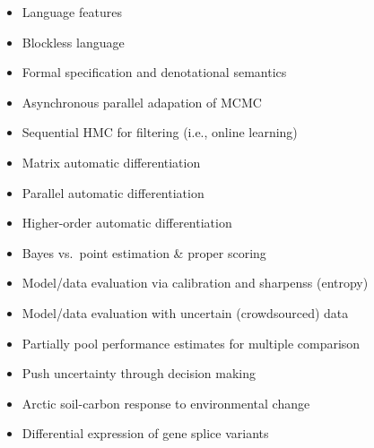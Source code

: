 \documentclass[10pt]{report}
\begin{document}
\begin{itemize}
\item Language features
\item Blockless language
\item Formal specification and denotational semantics
\end{itemize}

\begin{itemize}
\item Asynchronous parallel adapation of MCMC
\item Sequential HMC for filtering (i.e., online learning)
\item Matrix automatic differentiation
\item Parallel automatic differentiation
\item Higher-order automatic differentiation
\end{itemize}

\begin{itemize}
\item Bayes vs.\ point estimation \& proper scoring
\item Model/data evaluation via calibration and sharpenss (entropy)
\item Model/data evaluation with uncertain (crowdsourced) data
\item Partially pool performance estimates for multiple comparison
\item Push uncertainty through decision making
\end{itemize}

\begin{itemize}
\item Arctic soil-carbon response to environmental change
\item Differential expression of gene splice variants
\end{itemize}
\end{document}
